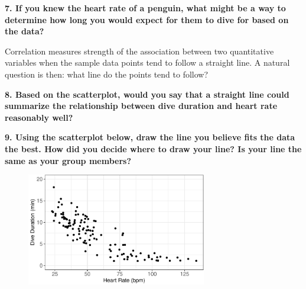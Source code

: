 \documentclass[
  letterpaper,
  DIV=11,
  numbers=noendperiod]{scrartcl}
\begin{document}
\textbf{7. If you knew the heart rate of a penguin, what might be a way
to determine how long you would expect for them to dive for based on the
data?}


\vspace{0.5cm}

Correlation measures strength of the association between two
quantitative variables when the sample data points tend to follow a
straight line. A natural question is then: what line do the points tend
to follow?

\vspace{0.5cm}

\textbf{8. Based on the scatterplot, would you say that a straight line
could summarize the relationship between dive duration and heart rate
reasonably well?}


\vspace{0.5cm}

\textbf{9. Using the scatterplot below, draw the line you believe fits
the data the best. How did you decide where to draw your line? Is your
line the same as your group members?}

\begin{figure}

{\centering \includegraphics[width=0.7\textwidth,height=\textheight]{activity4-diving-penguins-key_files/figure-pdf/draw-line-1.pdf}

}

\end{figure}

\end{document}
